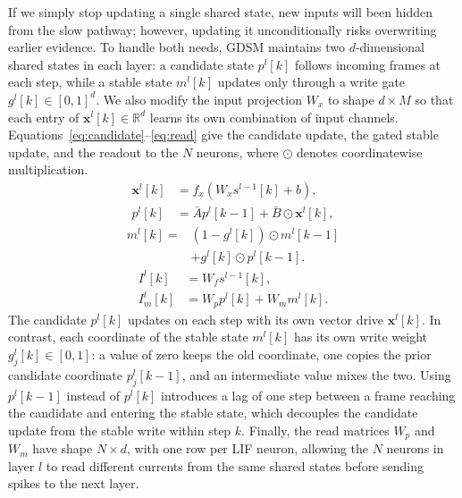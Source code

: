 \documentclass[10pt,twocolumn]{article}
\newcommand{\R}{\mathbb{R}}
\begin{document}
If we simply stop updating a single shared state, new inputs will been hidden from the slow pathway; however, updating it unconditionally risks overwriting earlier evidence. To handle both needs, GDSM maintains two $d$-dimensional shared states in each layer: a candidate state $p^l[k]$ follows incoming frames at each step, while a stable state $m^l[k]$ updates only through a write gate $g^l[k]\in[0,1]^d$. We also modify the input projection $W_x$ to shape $d\times M$ so that each entry of $\mathbf{x}^l[k]\in\R^d$ learns its own combination of input channels. Equations~\eqref{eq:candidate}--\eqref{eq:read} give the candidate update, the gated stable update, and the readout to the $N$ neurons, where $\odot$ denotes coordinatewise multiplication.
\begin{equation}
\begin{aligned}
 \mathbf{x}^l[k]&=f_x(W_x s^{l-1}[k]+b),\\
 p^l[k]&=\bar A p^l[k-1]+\bar B\odot \mathbf{x}^l[k] ,
\end{aligned}
\label{eq:candidate}
\end{equation}
\begin{equation}
\begin{aligned}
 m^l[k]={}&(1-g^l[k])\odot m^l[k-1]\\
 &+g^l[k]\odot p^l[k-1].
\end{aligned}
\label{eq:stable}
\end{equation}
\begin{equation}
\begin{aligned}
 I^l[k]&=W_f s^{l-1}[k],\\
 I_m^l[k]&=W_p p^l[k]+W_m m^l[k].
\end{aligned}
\label{eq:read}
\end{equation}
The candidate $p^l[k]$ updates on each step with its own vector drive $\mathbf{x}^l[k]$. In contrast, each coordinate of the stable state $m^l[k]$ has its own write weight $g_j^l[k]\in[0,1]$: a value of zero keeps the old coordinate, one copies the prior candidate coordinate $p_j^l[k-1]$, and an intermediate value mixes the two. Using $p^l[k-1]$ instead of $p^l[k]$ introduces a lag of one step between a frame reaching the candidate and entering the stable state, which decouples the candidate update from the stable write within step $k$. Finally, the read matrices $W_p$ and $W_m$ have shape $N\times d$, with one row per LIF neuron, allowing the $N$ neurons in layer $l$ to read different currents from the same shared states before sending spikes to the next layer.
\end{document}
